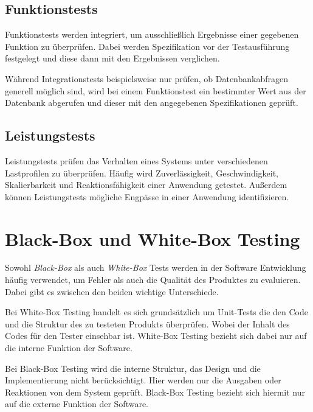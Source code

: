 \documentclass[a4paper, fontsize=11pt, parskip=half, twoside]{scrreprt}
\begin{document}
	\subsection{Funktionstests}
	Funktionstests werden integriert, um ausschließlich Ergebnisse einer gegebenen Funktion zu überprüfen. Dabei werden Spezifikation vor der Testausführung festgelegt und diese dann mit den Ergebnissen verglichen.
	
	Während Integrationstests beispielsweise nur prüfen, ob Datenbankabfragen generell möglich sind, wird bei einem Funktionstest ein bestimmter Wert aus der Datenbank abgerufen und dieser mit den angegebenen Spezifikationen geprüft.
	
	\subsection{Leistungstests}
	Leistungstests prüfen das Verhalten eines Systems unter verschiedenen Lastprofilen zu überprüfen. 
	Häufig wird Zuverlässigkeit, Geschwindigkeit, Skalierbarkeit und Reaktionsfähigkeit einer Anwendung getestet. 
	Außerdem können Leistungstests mögliche Engpässe in einer Anwendung identifizieren.
	
	
	\section{Black-Box und White-Box Testing}
	Sowohl \emph{Black-Box} als auch \emph{White-Box} Tests werden in der Software Entwicklung häufig verwendet, um Fehler als auch die Qualität des Produktes zu evaluieren. 
	Dabei gibt es zwischen den beiden wichtige Unterschiede.
	
	Bei White-Box Testing handelt es sich grundsätzlich um Unit-Tests die den Code und die Struktur des zu testeten Produkts überprüfen. 
	Wobei der Inhalt des Codes für den Tester einsehbar ist.
	White-Box Testing bezieht sich dabei nur auf die interne Funktion der Software.
	
	Bei Black-Box Testing wird die interne Struktur, das Design und die Implementierung nicht berücksichtigt.
	Hier werden nur die Ausgaben oder Reaktionen von dem System geprüft.
	Black-Box Testing bezieht sich hiermit nur auf die externe Funktion der Software.
	
	\textcite[Seite 12]{nidhra_black_2012}
	
\end{document}
